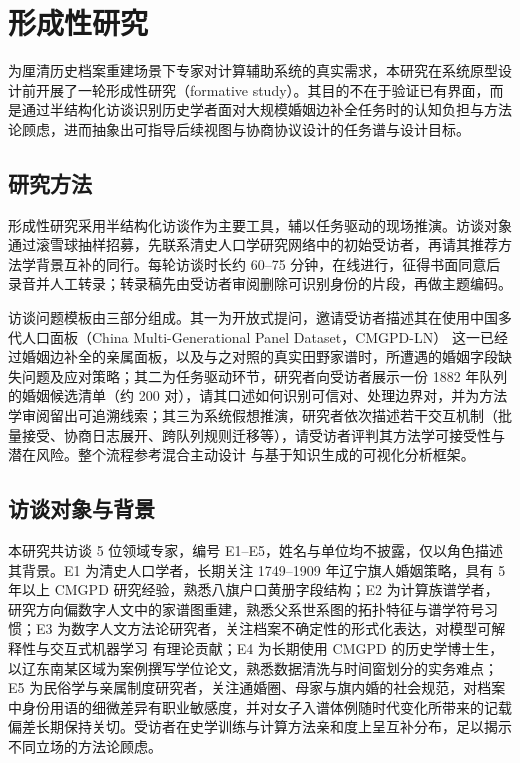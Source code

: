 \chapter{形成性研究}\label{chap:formative}

为厘清历史档案重建场景下专家对计算辅助系统的真实需求，本研究在系统原型设计前开展了一轮形成性研究（formative study）。其目的不在于验证已有界面，而是通过半结构化访谈识别历史学者面对大规模婚姻边补全任务时的认知负担与方法论顾虑，进而抽象出可指导后续视图与协商协议设计的任务谱与设计目标。

\section{研究方法}\label{sec:formative-method}

形成性研究采用半结构化访谈作为主要工具，辅以任务驱动的现场推演。访谈对象通过滚雪球抽样招募，先联系清史人口学研究网络中的初始受访者，再请其推荐方法学背景互补的同行。每轮访谈时长约 60--75 分钟，在线进行，征得书面同意后录音并人工转录；转录稿先由受访者审阅删除可识别身份的片段，再做主题编码。

访谈问题模板由三部分组成。其一为开放式提问，邀请受访者描述其在使用中国多代人口面板（China Multi-Generational Panel Dataset，CMGPD-LN）\citep{campbell2011data} 这一已经过婚姻边补全的亲属面板，以及与之对照的真实田野家谱时，所遭遇的婚姻字段缺失问题及应对策略；其二为任务驱动环节，研究者向受访者展示一份 1882 年队列的婚姻候选清单（约 200 对），请其口述如何识别可信对、处理边界对，并为方法学审阅留出可追溯线索；其三为系统假想推演，研究者依次描述若干交互机制（批量接受、协商日志展开、跨队列规则迁移等），请受访者评判其方法学可接受性与潜在风险。整个流程参考混合主动设计\citep{green2009mixedinitiative} 与基于知识生成的可视化分析框架\citep{sacha2014knowledge}。

\section{访谈对象与背景}\label{sec:formative-experts}

本研究共访谈 5 位领域专家，编号 E1--E5，姓名与单位均不披露，仅以角色描述其背景。E1 为清史人口学者，长期关注 1749--1909 年辽宁旗人婚姻策略，具有 5 年以上 CMGPD 研究经验，熟悉八旗户口黄册字段结构\citep{shiue2022marriage}；E2 为计算族谱学者，研究方向偏数字人文中的家谱图重建，熟悉父系世系图的拓扑特征与谱学符号习惯\citep{zhao2001chinese}；E3 为数字人文方法论研究者，关注档案不确定性的形式化表达，对模型可解释性与交互式机器学习\citep{fails2003interactiveml, amershi2014modeltracker} 有理论贡献；E4 为长期使用 CMGPD 的历史学博士生，以辽东南某区域为案例撰写学位论文，熟悉数据清洗与时间窗划分的实务难点\citep{shan2025reexamining}；E5 为民俗学与亲属制度研究者，关注通婚圈、母家与旗内婚的社会规范，对档案中身份用语的细微差异有职业敏感度\citep{duff2003list}，并对女子入谱体例随时代变化所带来的记载偏差长期保持关切\citep{yan2009nuzi}。受访者在史学训练与计算方法亲和度上呈互补分布，足以揭示不同立场的方法论顾虑。


